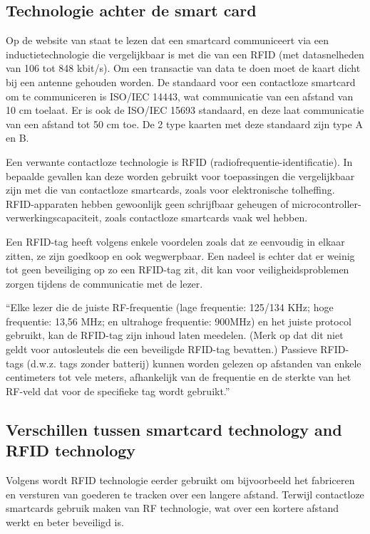 \subsection{Technologie achter de smart card}
Op de website van \textcite{STASmartCard} staat te lezen dat een smartcard communiceert via een inductietechnologie die vergelijkbaar is met die van een RFID (met datasnelheden van 106 tot 848 kbit/s). Om een transactie van data te doen moet de kaart dicht bij een antenne gehouden worden. De standaard voor een contactloze smartcard om te communiceren is ISO/IEC 14443, wat communicatie van een afstand van 10 cm toelaat. Er is ook de ISO/IEC 15693 standaard, en deze laat communicatie van een afstand tot 50 cm toe. De 2 type kaarten met deze standaard zijn type A en B. 

Een verwante contactloze technologie is RFID (radiofrequentie-identificatie). In bepaalde gevallen kan deze worden gebruikt voor toepassingen die vergelijkbaar zijn met die van contactloze smartcards, zoals voor elektronische tolheffing. RFID-apparaten hebben gewoonlijk geen schrijfbaar geheugen of microcontroller-verwerkingscapaciteit, zoals contactloze smartcards vaak wel hebben.

Een RFID-tag heeft volgens \textcite{STASmartCard} enkele voordelen zoals dat ze eenvoudig in elkaar zitten, ze zijn goedkoop en ook wegwerpbaar. Een nadeel is echter dat er weinig tot geen beveiliging op zo een RFID-tag zit, dit kan voor veiligheidsproblemen zorgen tijdens de communicatie met de lezer.

``Elke lezer die de juiste RF-frequentie (lage frequentie: 125/134 KHz; hoge frequentie: 13,56 MHz; en ultrahoge frequentie: 900MHz) en het juiste protocol gebruikt, kan de RFID-tag zijn inhoud laten meedelen. (Merk op dat dit niet geldt voor autosleutels die een beveiligde RFID-tag bevatten.) Passieve RFID-tags (d.w.z. tags zonder batterij) kunnen worden gelezen op afstanden van enkele centimeters tot vele meters, afhankelijk van de frequentie en de sterkte van het RF-veld dat voor de specifieke tag wordt gebruikt.''\autocite{STASmartCard}

\subsection{Verschillen tussen smartcard technology and RFID technology}
Volgens \textcite{STASmartCard} wordt RFID technologie eerder gebruikt om bijvoorbeeld het fabriceren en versturen van goederen te tracken over een langere afstand. Terwijl contactloze smartcards gebruik maken van RF technologie, wat over een kortere afstand werkt en beter beveiligd is.

